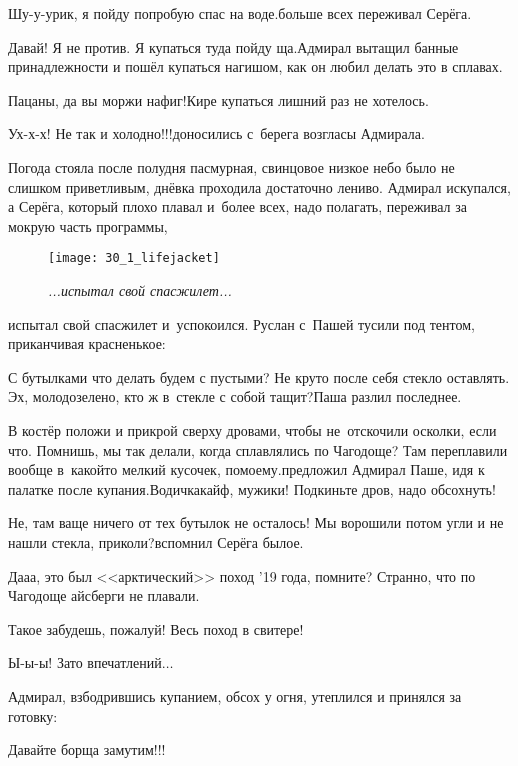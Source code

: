 \diagdash Шу-у-урик, я пойду попробую спас на воде.\mdash больше всех переживал Серёга. 

\diagdash Давай! Я не против. Я купаться туда пойду ща.\mdash Адмирал вытащил банные принадлежности и пошёл купаться нагишом, как он любил делать это в сплавах.

\diagdash Пацаны, да вы моржи нафиг!\mdash Кире купаться лишний раз не хотелось. 

\diagdash Ух-х-х! Не так и холодно!!!\mdash доносились с~берега возгласы Адмирала.

Погода стояла после полудня пасмурная, свинцовое низкое небо было не слишком приветливым, днёвка проходила достаточно лениво. Адмирал искупался, а Серёга, который плохо плавал и~более всех, надо полагать, переживал за мокрую часть программы, \begin{wrapfigure}[10]{r}{0.55\textwidth}
	\centering
	\texttt{[image: 30\_1\_lifejacket]}
	\caption{\small\textit{...испытал свой спасжилет...}}
\end{wrapfigure}испытал свой спасжилет и~успокоился. Руслан с~Пашей тусили под тентом, приканчивая красненькое:


\diagdash С бутылками что делать будем с пустыми? Не круто после себя стекло оставлять. Эх, молодо\sdash зелено, кто ж в~стекле с собой тащит?\mdash Паша разлил последнее.

\diagdash В костёр положи и прикрой сверху дровами, чтобы не~отскочили осколки, если что. Помнишь, мы так делали, когда сплавлялись по Чагодоще? Там переплавили вообще в~какой\sdash то мелкий кусочек, по\sdash моему.\mdash предложил Адмирал Паше, идя к палатке после купания.\mdash Водичка\mdash кайф, мужики! Подкиньте дров, надо обсохнуть!

\diagdash Не, там ваще ничего от тех бутылок не осталось! Мы ворошили потом угли и не нашли стекла, приколи?\mdash вспомнил Серёга былое.

\diagdash Да\sdash а\sdash а, это был <<арктический>> поход '19 года, помните? Странно, что по Чагодоще айсберги не плавали.

\diagdash Такое забудешь, пожалуй! Весь поход в свитере!

\diagdash Ы-ы-ы! Зато впечатлений$\ldots$

Адмирал, взбодрившись купанием, обсох у огня, утеплился и принялся за готовку:

\diagdash Давайте борща замутим!!!

